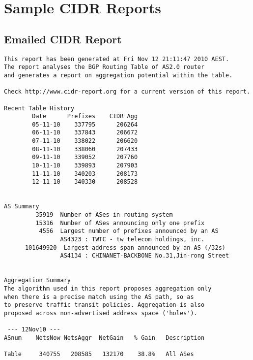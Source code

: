 \chapter{Sample CIDR Reports}
\label{chap:cidr_reports}

\section{Emailed CIDR Report}
\begin{lstlisting}[frame=trl]
This report has been generated at Fri Nov 12 21:11:47 2010 AEST.
The report analyses the BGP Routing Table of AS2.0 router
and generates a report on aggregation potential within the table.

Check http://www.cidr-report.org for a current version of this report.

Recent Table History
        Date      Prefixes    CIDR Agg
        05-11-10    337795      206264
        06-11-10    337843      206672
        07-11-10    338022      206620
        08-11-10    338060      207433
        09-11-10    339052      207760
        10-11-10    339893      207903
        11-11-10    340203      208173
        12-11-10    340330      208528


AS Summary
         35919  Number of ASes in routing system
         15316  Number of ASes announcing only one prefix
          4556  Largest number of prefixes announced by an AS
                AS4323 : TWTC - tw telecom holdings, inc.
      101649920  Largest address span announced by an AS (/32s)
                AS4134 : CHINANET-BACKBONE No.31,Jin-rong Street


Aggregation Summary
The algorithm used in this report proposes aggregation only
when there is a precise match using the AS path, so as
to preserve traffic transit policies. Aggregation is also
proposed across non-advertised address space ('holes').

 --- 12Nov10 ---
ASnum    NetsNow NetsAggr  NetGain   % Gain   Description

Table     340755   208585   132170    38.8%   All ASes


\end{lstlisting}
